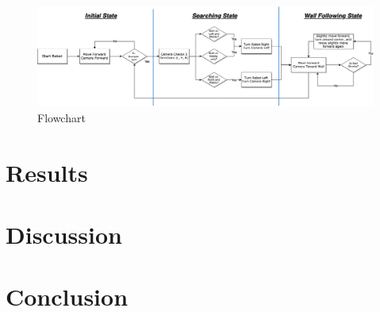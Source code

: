 \documentclass[a4paper,12pt,twocolumn]{article}
\begin{document}
\begin{figure}[ht]
\centering
\includegraphics[width=\linewidth]{figures/System-Flowchart.png}
\caption{Flowchart}
  \label{fig:flowchart}
\end{figure}


\section{Results}

\section{Discussion}

\section{Conclusion}

\clearpage


\end{document}
